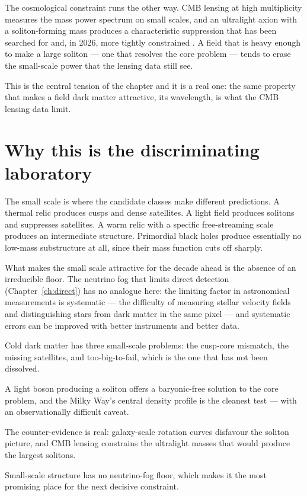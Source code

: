 The cosmological constraint runs the other way. CMB lensing at high
multiplicity measures the mass power spectrum on small scales, and an
ultralight axion with a soliton-forming mass produces a characteristic
suppression that has been searched for and, in 2026, more tightly constrained
. A field that is heavy enough to make a
large soliton --- one that resolves the core problem --- tends to erase the
small-scale power that the lensing data still see.

This is the central tension of the chapter and it is a real one: the same
property that makes a field dark matter attractive, its wavelength, is what
the CMB lensing data limit.

\section{Why this is the discriminating laboratory}The small scale is where the candidate classes make
different predictions. A thermal relic produces cusps and dense satellites. A
light field produces solitons and suppresses satellites. A warm relic with a
specific free-streaming scale produces an intermediate structure. Primordial
black holes produce essentially no low-mass substructure at all, since their
mass function cuts off sharply.

What makes the small scale attractive for the decade ahead is the absence of
an irreducible floor. The neutrino fog that limits direct detection
(Chapter~\ref{ch:direct}) has no analogue here: the limiting factor in
astronomical measurements is systematic --- the difficulty of measuring
stellar velocity fields and distinguishing stars from dark matter in the same
pixel --- and systematic errors can be improved with better instruments and
better data.

\begin{keytakeaways}
\item Cold dark matter has three small-scale problems: the cusp-core
mismatch, the missing satellites, and too-big-to-fail, which is the one that
has not been dissolved.
\item A light boson producing a soliton offers a baryonic-free solution to
the core problem, and the Milky Way's central density profile is the cleanest
test --- with an observationally difficult caveat.
\item The counter-evidence is real: galaxy-scale rotation curves disfavour the
soliton picture, and CMB lensing constrains the ultralight masses that would
produce the largest solitons.
\item Small-scale structure has no neutrino-fog floor, which makes it the most
promising place for the next decisive constraint.
\end{keytakeaways}
